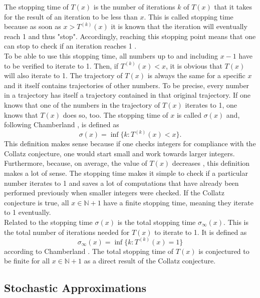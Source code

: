 \documentclass[12pt,a4paper,reqno]{amsart}
\begin{document}
The stopping time of $T(x)$ is the number of iterations $k$ of $T(x)$ that it 
takes for the result of an iteration to be less than $x$. This is called 
stopping time because as soon as $x > T^{(k)}(x)$ it is known that the 
iteration will eventually reach 1 and thus "stop". Accordingly, reaching this 
stopping point means that one can stop to check if an iteration reaches
1 \cite{src:lagarias}. \\
To be able to use this stopping time, all numbers up to and including $x-1$ 
have to be verified to iterate to 1. Then, if $T^{(k)}(x) < x$, it is obvious 
that $T(x)$ will also iterate to 1. The trajectory of $T(x)$ is always the same 
for a specific $x$ and it itself contains trajectories of other numbers. To be
precise, every number in a trajectory has itself a trajectory contained in that
original trajectory. If one knows that one of the numbers in the trajectory of
$T(x)$ iterates to 1, one knows that $T(x)$ does so, too.
The stopping time of $x$ is called $\sigma(x)$ and, following Chamberland
\cite{src:chamberland}, is defined as
\begin{equation}
    \nonumber
    \sigma(x)=\inf\{k:T^{(k)}(x) < x\}.
\end{equation}
This definition makes sense because if one checks integers for compliance with
the Collatz conjecture, one would start small and work towards larger 
integers. Furthermore, because, on average, the value of $T(x)$ decreases
\cite{src:lagarias}, this definition makes a lot of sense. The stopping time 
makes it simple to check if a particular number iterates to 1 and saves a lot 
of computations that have already been performed previously when smaller
integers were checked. If the Collatz conjecture is true, all 
$x \in \mathbb{N} + 1$ have a finite stopping time, meaning they iterate to 1 
eventually. \\
Related to the stopping time $\sigma(x)$ is the total stopping time 
$\sigma_{\infty}(x)$. This is the total number of iterations needed for $T(x)$ 
to iterate to 1. It is defined as
\begin{equation}
    \nonumber
    \sigma_{\infty}(x)=\inf\{k:T^{(k)}(x)=1\}
\end{equation}
according to Chamberland \cite{src:chamberland}. The total stopping time of 
$T(x)$ is conjectured to be finite for all $x \in \mathbb{N} + 1$ as a direct 
result of the Collatz conjecture.

\subsection{Stochastic Approximations}
\end{document}
